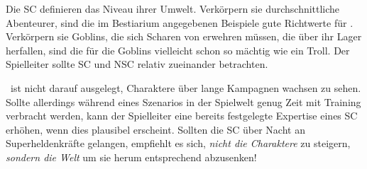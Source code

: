 {	

		\noindent
		Die SC definieren das Niveau ihrer Umwelt. Verkörpern sie durchschnittliche Abenteurer, sind die im Bestiarium angegebenen Beispiele gute Richtwerte für . Verkörpern sie Goblins, die sich Scharen von  erwehren müssen, die über ihr Lager herfallen, sind die  für die Goblins vielleicht schon so mächtig wie ein Troll. Der Spielleiter sollte SC und NSC relativ zueinander betrachten.

		\nipajin\ ist nicht darauf ausgelegt, Charaktere über lange Kampagnen wachsen zu sehen. Sollte allerdings während eines Szenarios in der Spielwelt genug Zeit mit Training verbracht werden, kann der Spielleiter eine bereits festgelegte Expertise eines SC erhöhen, wenn dies plausibel erscheint. Sollten die SC über Nacht an Super\-hel\-den\-kräfte gelangen, empfiehlt es sich, \emph{nicht die Charaktere} zu steigern, \emph{sondern die Welt} um sie herum entsprechend abzusenken!
}
